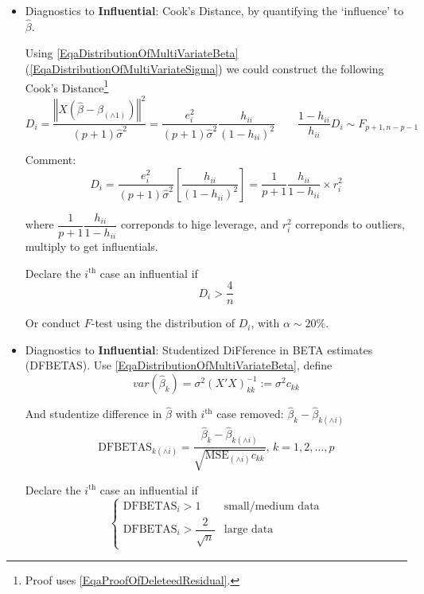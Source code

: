 \begin{itemize}[topsep=2pt,itemsep=0pt]
    \item Diagnostics to \textbf{Influential}: Cook's Distance, by quantifying the `influence' to $ \hat{\beta } $.
    
    Using \autoref{EqaDistributionOfMultiVariateBeta}(\autoref{EqaDistributionOfMultiVariateSigma}) we could construct the following Cook's Distance\footnote{Proof uses \autoref{EqaProofOfDeleteedResidual}.}
    \begin{equation}
         D_i=\dfrac{\left\Vert X(\hat{\beta} -\hat{\beta }_{(\wedge 1)})\right\Vert ^2}{(p+1)\hat{\sigma }^2}=\dfrac{e_i^2}{(p+1)\hat{\sigma }^2}\dfrac{h_{ii}}{(1-h_{ii})^2}\qquad \dfrac{1-h_{ii}}{h_{ii}}D_i\sim F_{p+1,n-p-1}
    \end{equation}
    
    Comment:
    \begin{equation}
        D_i=\dfrac{e_i^2}{(p+1)\hat{\sigma }^2}\left[ \dfrac{h_{ii}}{(1-h_{ii})^2} \right]=\dfrac{1}{p+1}\dfrac{h_{ii}}{1-h_{ii}}\times r_i^2
    \end{equation}

   where $ \dfrac{1}{p+1}\dfrac{h_{ii}}{1-h_{ii}} $ correponds to hige leverage, and $ r_{i}^2 $ correponds to outliers, multiply to get influentials.

   Declare the $ i^\mathrm{th}  $ case an {influential} if 
   \begin{equation}
       D_i>\dfrac{4}{n}
   \end{equation}
   
   Or conduct $ F $-test using the distribution of $ D_i $, with $ \alpha \sim 20\% $. 

   \item Diagnostics to \textbf{Influential}: Studentized DiFference in BETA estimates (DFBETAS). Use \autoref{EqaDistributionOfMultiVariateBeta}, define
   \begin{equation}
       var(\hat{\beta }_k)=\sigma ^2(X'X)^{-1}_{kk}:=\sigma ^2c_{kk} 
   \end{equation}
   
   And studentize difference in $ \hat{\beta } $ with $ i^\mathrm{th} $ case removed: $ \hat{\beta }_k-\hat{\beta }_{k(\wedge i)} $
   \begin{equation}
       \mathrm{DFBETAS}_{k(\wedge i)}=\dfrac{\hat{\beta }_k-\hat{\beta }_{k(\wedge i)}}{\sqrt{\mathrm{MSE}_{(\wedge i)}c_{kk} }},\,k=1,2,\ldots, p
   \end{equation}
   
   Declare the $ i^\mathrm{th}  $ case an {influential} if 
   \begin{equation}
    \begin{cases}
        \mathrm{DFBETAS}_i>1&\text{small/medium data} \\
        \mathrm{DFBETAS}_i>\dfrac{2}{\sqrt{n}}&\text{large data}
    \end{cases}   
   \end{equation}
   
   
   
   

\end{itemize}

